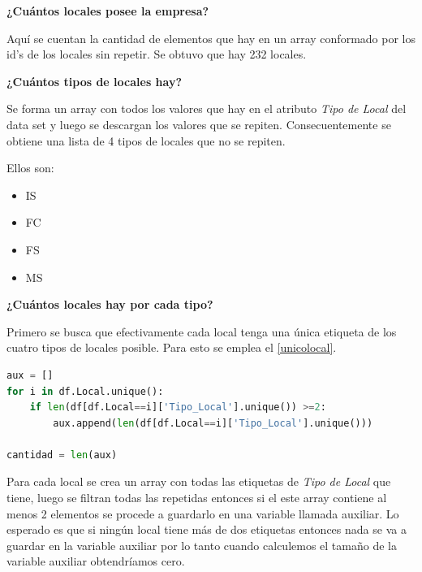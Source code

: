 \documentclass[11pt,spanish]{article}
\begin{document}
\vspace{3mm}

\textbf{¿Cuántos locales posee la empresa?}

\vspace{3mm}


Aquí se cuentan la cantidad de elementos que hay en un array conformado por los id's de los locales sin repetir. 
Se obtuvo que hay 232 locales. 

\vspace{3mm}

\textbf{¿Cuántos tipos de locales hay?}

\vspace{3mm}

Se forma un array con todos los valores que hay en el atributo \textit{Tipo de Local} del data set y luego se descargan los valores que se repiten.
Consecuentemente se obtiene una lista de 4 tipos de locales que no se repiten. 

Ellos son:  

\begin{itemize}
    \item IS
    \item FC
    \item FS
    \item MS
\end{itemize}

\vspace{3mm}

\textbf{¿Cuántos locales hay por cada tipo?}

\vspace{3mm}

Primero se busca que efectivamente cada local tenga una única etiqueta de los cuatro tipos de locales posible. 
Para esto se emplea el \cref{unicolocal}.

\begin{lstlisting}[language=Python, caption = la variable \textbf{cantidad} indica cuantos locales tienen más de una etiqueta para el feature \textit{Tipo de local.}, label=unicolocal]
aux = []
for i in df.Local.unique():
    if len(df[df.Local==i]['Tipo_Local'].unique()) >=2:
        aux.append(len(df[df.Local==i]['Tipo_Local'].unique()))

cantidad = len(aux)

\end{lstlisting}

Para cada local se crea un array con todas las etiquetas de \textit{Tipo de Local} que tiene, luego se filtran todas las repetidas entonces si el este array contiene al menos 2 elementos se procede a guardarlo en una variable llamada auxiliar. Lo esperado es que si ningún local tiene más de dos etiquetas entonces nada se va a guardar en la variable auxiliar por lo tanto cuando calculemos el tamaño de la variable auxiliar obtendríamos cero.
\end{document}
